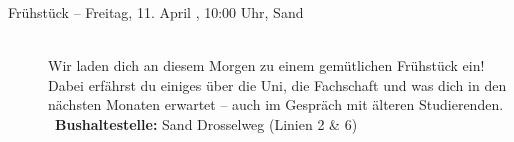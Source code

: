 \begin{description}
\ifbachelor
    \item[Frühstück -- Freitag, 11. April \YEAR, 10:00 Uhr, Sand]\ \\
    Wir laden dich an diesem Morgen zu einem gemütlichen Frühstück ein! Dabei erfährst du einiges über die Uni, die Fachschaft und was dich in den nächsten Monaten erwartet -- auch im Gespräch mit älteren Studierenden.\\
     ~\textbf{Bushaltestelle:} Sand Drosselweg (Linien 2 \& 6)
\fi



\end{description}
